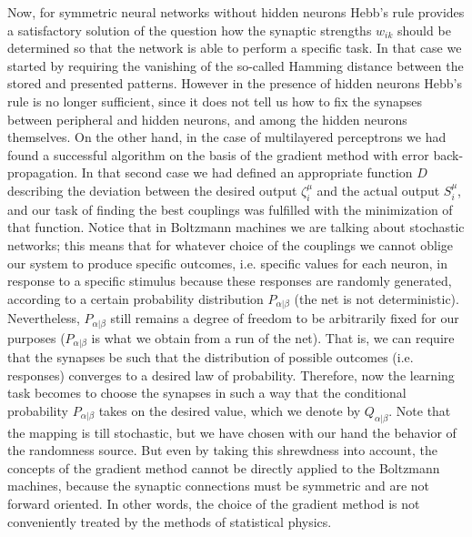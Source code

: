 Now, for symmetric neural networks without hidden neurons Hebb's rule provides a satisfactory solution of the question how the synaptic strengths $w_{ik}$ should be determined so that the network is able to perform a specific task. In that case we started by requiring the vanishing of the so-called Hamming distance between the stored and presented patterns. However in the presence of hidden neurons Hebb's rule is no longer sufficient, since it does not tell us how to fix the synapses between peripheral and hidden neurons, and among the hidden neurons themselves. On the other hand, in the case of multilayered perceptrons we had found a successful algorithm on the basis of the gradient method with error back-propagation. In that second case we had defined an appropriate function $D$ describing the deviation between the desired output $\zeta_i^\mu$ and the actual output $S_i^\mu$, and our task of finding the best couplings was fulfilled with the minimization of that function. Notice that in Boltzmann machines we are talking about stochastic networks; this means that for whatever choice of the couplings we cannot oblige our system to produce specific outcomes, i.e. specific values for each neuron, in response to a specific stimulus because these responses are randomly generated, according to a certain probability distribution $P_{\alpha|\beta}$ (the net is not deterministic). Nevertheless, $P_{\alpha|\beta}$ still remains a degree of freedom to be arbitrarily fixed for our purposes ($P_{\alpha|\beta}$ is what we obtain from a run of the net). That is, we can require that the synapses be such that the distribution of possible outcomes (i.e. responses) converges to a desired law of probability. Therefore, now the learning task becomes to choose the synapses in such a way that the conditional probability $P_{\alpha|\beta}$ takes on the desired value, which we denote by $Q_{\alpha|\beta}$. Note that the mapping is till stochastic, but we have chosen with our hand the behavior of the randomness source. But even by taking this shrewdness into account, the concepts of the gradient method cannot be directly applied to the Boltzmann machines, because the synaptic connections must be symmetric and are not forward oriented. In other words, the choice of the gradient method is not conveniently treated by the methods of statistical physics.

